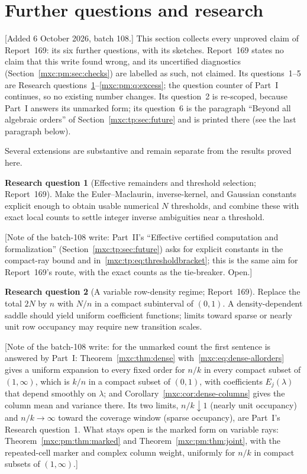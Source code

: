\documentclass[11pt]{article}
\numberwithin{equation}{section}
\theoremstyle{definition}
\newtheorem{question}{Research question}
\theoremstyle{remark}
\begin{document}
\section{Further questions and research}\label{mxc:pm:sec:questions}

[Added 6 October 2026, batch 108.] This section collects every unproved
claim of Report~169: its six further questions, with its sketches. Report~169
states no claim that this write found wrong, and its uncertified diagnostics
(Section~\ref{mxc:pm:sec:checks}) are labelled as such, not claimed. Its
questions~1--5 are Research
questions~\ref{mxc:pm:q:effective}--\ref{mxc:pm:q:excess}; the question counter
of Part~I continues, so no existing number changes. Its question~2 is
re-scoped, because Part~I answers its unmarked form; its question~6 is the
paragraph ``Beyond all algebraic orders'' of Section~\ref{mxc:tp:sec:future}
and is printed there (see the last paragraph below).

Several extensions are substantive and remain separate from the results
proved here.

\begin{question}[Effective remainders and threshold selection; Report~169]\label{mxc:pm:q:effective}
Make the Euler--Maclaurin, inverse-kernel, and Gaussian constants explicit
enough to obtain usable numerical $N$ thresholds, and combine these with exact
local counts to settle integer inverse ambiguities near a threshold.
\end{question}
[Note of the batch-108 write: Part~II's ``Effective certified computation and
formalization'' (Section~\ref{mxc:tp:sec:future}) asks for explicit constants
in the compact-ray bound and in~\eqref{mxc:tp:eq:thresholdbracket}; this is
the same aim for Report~169's route, with the exact counts as the tie-breaker.
Open.]

\begin{question}[A variable row-density regime; Report~169]\label{mxc:pm:q:density}
Replace the total $2N$ by $n$ with $N/n$ in a compact subinterval of $(0,1)$.
A density-dependent saddle should yield uniform coefficient functions; limits
toward sparse or nearly unit row occupancy may require new transition scales.
\end{question}
[Note of the batch-108 write: for the unmarked count the first sentence is
answered by Part~I: Theorem~\ref{mxc:thm:dense} with~\eqref{mxc:eq:dense-allorders}
gives a uniform expansion to every fixed order for $n/k$ in every compact
subset of $(1,\infty)$, which is $k/n$ in a compact subset of $(0,1)$, with
coefficients $E_j(\lambda)$ that depend smoothly on $\lambda$; and
Corollary~\ref{mxc:cor:dense-columns} gives the column mean and variance there.
Its two limits, $n/k\downarrow1$ (nearly unit occupancy) and $n/k\to\infty$
toward the coverage window (sparse occupancy), are Part~I's Research
question~1. What stays open is the marked form on variable rays:
Theorem~\ref{mxc:pm:thm:marked} and Theorem~\ref{mxc:pm:thm:joint}, with the
repeated-cell marker and complex column weight, uniformly for $n/k$ in compact
subsets of $(1,\infty)$.]
\end{document}
